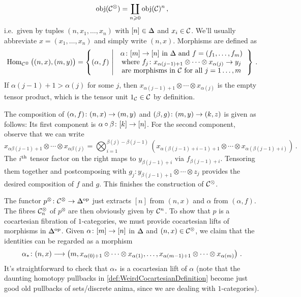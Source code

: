 \begin{exm}
\begin{alphanumerate}
		\begin{equation*}
			\operatorname{obj}(\mathcal{C}^\otimes)=\coprod_{n\geqslant 0}\operatorname{obj}(\mathcal{C})^n\,,
		\end{equation*}
		i.e.\ given by tuples $(n, x_1,\dotsc,x_n)$ with $[n]\in \IDelta$ and $x_i\in \mathcal{C}$. We'll usually abbreviate $x=(x_1,\dotsc,x_n)$ and simply write $(n,x)$. Morphisms are defined as
		\begin{equation*}
			\Hom_{\Cc^\otimes}\big((n,x),(m,y)\big)=\left\{(\alpha,f)\st \begin{tabular}{c}
				$\alpha\colon [m]\rightarrow [n]$ in $\IDelta$ and $f=(f_1,\dotsc,f_m)$\\
				where $f_j\colon x_{\alpha(j-1)+1}\otimes\dotsb\otimes x_{\alpha(j)}\rightarrow y_j$\\
				are morphisms in $\Cc$ for all $j=1\dotsc,m$
			\end{tabular}\right\}\,.
		\end{equation*}
		If $\alpha(j-1)+1>\alpha(j)$ for some $j$, then $x_{\alpha(j-1)+1}\otimes\dotsb\otimes x_{\alpha(j)}$ is the empty tensor product, which is the tensor unit $1_{\mathcal{C}}\in\mathcal{C}$ by definition.
		
		The composition of $(\alpha,f)\colon(n,x)\morphism (m,y)$ and $(\beta,g)\colon (m,y)\morphism (k,z)$ is given as follows: Its first component is $\alpha\circ\beta\colon [k]\morphism{[n]}$. For the second component, observe that we can write
		\begin{equation*}
			x_{\alpha\beta(j-1)+1}\otimes \dotsb \otimes x_{\alpha\beta(j)}=\bigotimes_{i=1}^{\beta(j)-\beta(j-1)}\left(x_{\alpha(\beta(j-1)+i-1)+1}\otimes\dotsb\otimes x_{\alpha(\beta(j-1)+i)}\right)\,.
		\end{equation*}
		The $i^{\text{th}}$ tensor factor on the right maps to $y_{\beta(j-1)+i}$ via $f_{\beta(j-1)+i}$. Tensoring them together and postcomposing with $g_j\colon y_{\beta(j-1)+1}\otimes\dotsb\otimes z_j$ provides the desired composition of $f$ and $g$. This finishes the construction of $\mathcal{C}^\otimes$.
		
		The functor $p^\otimes\colon \Cc^\otimes\morphism\IDelta^\op$ just extracts $[n]$ from $(n,x)$ and $\alpha$ from $(\alpha,f)$. The fibres $\mathcal{C}_n^\otimes$ of $p^\otimes$ are then obviously given by $\mathcal{C}^n$. To show that $p$ is a cocartesian fibration of $1$-categories, we must provide cocartesian lifts of morphisms in $\IDelta^\op$. Given $\alpha\colon [m]\morphism {}[n]$ in $\IDelta$ and $(n,x)\in \mathcal{C}^\otimes$, we claim that the identities can be regarded as a morphism
		\begin{equation*}
			\alpha_*\colon (n,x)\morphism \left(m,x_{\alpha(0)+1}\otimes\dotsb\otimes x_{\alpha(1)},\dotsc,x_{\alpha(m-1)+1}\otimes\dotsb\otimes x_{\alpha(m)}\right)\,.
		\end{equation*}
		It's straightforward to check that $\alpha_*$ is a cocartesian lift of $\alpha$ (note that the daunting homotopy pullbacks in \cref{def:WeirdCocartesianDefinition} become just good old pullbacks of sets/discrete anima, since we are dealing with $1$-categories).
		

\end{alphanumerate}
\end{exm}
